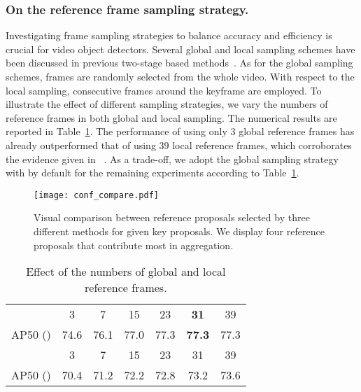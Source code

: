 \documentclass[letterpaper]{article} \usepackage{aaai23}  \usepackage{times}  \usepackage{helvet}  \usepackage{courier}  \usepackage[hyphens]{url}  \usepackage{graphicx} \urlstyle{rm} \def\UrlFont{\rm}  \usepackage{natbib}  \usepackage{caption} \usepackage{xcolor}
\begin{document}
\subsubsection{On the reference frame sampling strategy.} Investigating frame sampling strategies to balance accuracy and efficiency is crucial for video object detectors. Several global and local sampling schemes have been discussed in previous two-stage based methods~\cite{wu2019sequence,gong2021temporal,chen2020memory}. As for the global sampling schemes,  frames are randomly selected from the whole video. With respect to the local sampling,  consecutive frames around the keyframe are employed. To illustrate the effect of different sampling strategies, we vary the numbers of reference frames in both global and local sampling. The numerical results are reported in Table~\ref{table:effectiveness of local and global number}. The performance of using only 3 global reference frames has already outperformed that of using 39 local reference frames, which corroborates the evidence given in ~\cite{wu2019sequence,gong2021temporal}. As a trade-off, we adopt the global sampling strategy with  by default for the remaining experiments according to Table~\ref{table:effectiveness of local and global number}. 

\begin{figure*}[t]
\centering
\texttt{[image: conf\_compare.pdf]}
\caption{Visual comparison between reference proposals selected by three different methods for given key proposals. We display four reference proposals that contribute most in aggregation.}
\vspace{1mm}
\label{fig:conf compare}
\end{figure*}

\setlength{\tabcolsep}{4pt}

\begin{table}[t]
\begin{center}
\begin{tabular}{c|cccccc}
\hline\noalign{\smallskip}
 & 3 & 7 & 15 & 23 & \textbf{31} & 39\\
\noalign{\smallskip}
\hline
\noalign{\smallskip}
AP50 () & 74.6 & 76.1 & 77.0 & 77.3 & \textbf{77.3} & 77.3 \\
\hline
\hline\noalign{\smallskip}
 & 3 & 7 & 15 & 23 & 31 & 39\\
\noalign{\smallskip}
\hline
\noalign{\smallskip}
AP50 () & 70.4 & 71.2 & 72.2 & 72.8 & 73.2 & 73.6 \\
\hline
\end{tabular}
\end{center}
\caption{Effect of the numbers of global  and local  reference frames.}
\label{table:effectiveness of local and global number}
\end{table}
\end{document}
